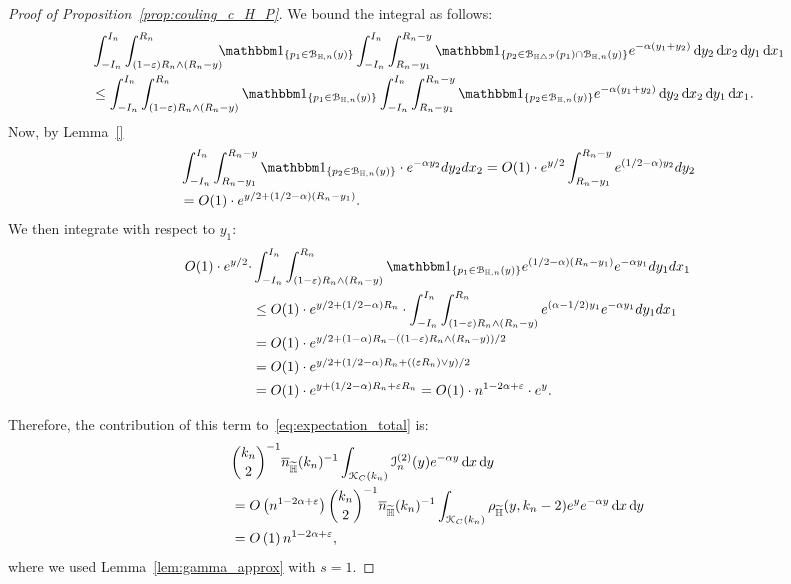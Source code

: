 \begin{proof}[Proof of Proposition~\ref{prop:couling_c_H_P}]
We bound the integral as follows: 
\begin{align*}
	&\int_{-I_n}^{I_n} \int_{(1-\eps) R_n \wedge (R_n-y)}^{R_n} \hspace{-5pt} \ind{p_1 \in \BallHyp{y}}
		\int_{-I_n}^{I_n} \int_{R_n - y_1}^{R_n - y} \ind{p_2 \in \BallSym{p_1} \cap \BallHyp{y}}
		e^{-\alpha(y_1 + y_2)} \dd y_2 \dd x_2 \dd y_1 \dd x_1 \\
	&\leq \int_{-I_n}^{I_n} \int_{(1-\eps) R_n \wedge (R_n-y)}^{R_n} \ind{p_1 \in \BallHyp{y}}
		\int_{-I_n}^{I_n} \int_{R_n - y_1}^{R_n - y} 
		\ind{p_2 \in  \BallHyp{y}} e^{-\alpha(y_1 + y_2)} \dd y_2 \dd x_2 \dd y_1 \dd x_1.
\end{align*}
Now, by Lemma~\ref{} 
\begin{align*}
&\int_{-I_n}^{I_n} \int_{R_n - y_1}^{R_n - y} \ind{p_2 \in  \BallHyp{y}} \cdot  
e^{-\alpha y_2} dy_2 dx_2 = O(1) \cdot e^{y/2} \int_{R_n - y_1}^{R_n - y} e^{(1/2 - \alpha) y_2} dy_2 \\
&= O(1) \cdot e^{y/2 + (1/2 - \alpha) (R_n - y_1)}.
\end{align*}
We then integrate with respect to $y_1$:
\begin{align*}
	O(1) \cdot e^{y/2} \cdot 
	&\int_{-I_n}^{I_n} \int_{(1-\eps) R_n \wedge (R_n-y)}^{R_n} \ind{p_1 \in \BallHyp{y}} 
		e^{(1/2 - \alpha) (R_n - y_1)} e^{-\alpha y_1} dy_1 dx_1 \\
	&\le O(1) \cdot e^{y/2 + (1/2 -\alpha) R_n} \cdot \int_{-I_n}^{I_n} \int_{(1-\eps) R_n \wedge (R_n-y)}^{R_n} 
		e^{(\alpha -1/2) y_1} e^{-\alpha y_1} dy_1dx_1 \\
	&=O(1) \cdot e^{y/2 + (1 -\alpha) R_n -((1-\eps) R_n \wedge (R_n-y))/2} \\
	&=O(1) \cdot e^{y/2 + (1/2 -\alpha) R_n + ((\eps R_n) \vee y)/2}\\
	&=O(1) \cdot e^{y + (1/2 -\alpha) R_n + \eps R_n}
		= O(1) \cdot n^{1- 2\alpha+ \eps} \cdot e^{y}. 
\end{align*}

Therefore, the contribution of this term to~\eqref{eq:expectation_total} is:
\begin{align*} 
	&\binom{k_n}{2}^{-1} \overline{n}_{\widetilde{\mathbb{H}}}(k_n)^{-1} 	\int_{{\mathcal K}_{C}(k_n)}\mathcal{I}_n^{(2)}(y) e^{-\alpha y} \operatorname{\mathrm{d}\hspace{-2pt}} x \operatorname{\mathrm{d}\hspace{-2pt}} y\\
	&= O\left( n^{1-2\alpha + \varepsilon} \right) {k_n \choose 2}^{-1} \overline{n}_{\widetilde{\mathbb{H}}}(k_n)^{-1} 
		\int_{{\mathcal K}_{C}(k_n)} \rho_{\widetilde{\mathbb{H}}}(y,k_n-2) e^{y} e^{-\alpha y} \operatorname{\mathrm{d}\hspace{-2pt}} x \operatorname{\mathrm{d}\hspace{-2pt}} y\\
	&= O\left(1\right) n^{1-2\alpha + \varepsilon},
\end{align*}
where we used Lemma~\ref{lem:gamma_approx} with $s = 1$.


\end{proof}
